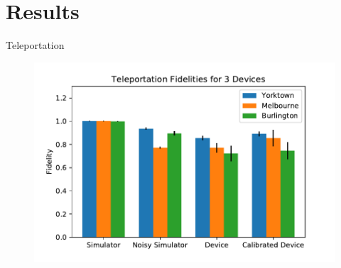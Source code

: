 \section{Results}

\begin{frame}{Teleportation}
\begin{figure} 
	\includegraphics[width=1\textwidth]{images/results/teleport_histogram.pdf}
\end{figure}
\end{frame}

